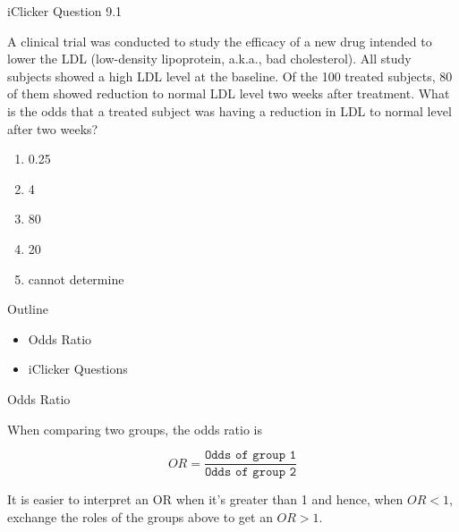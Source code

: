 \documentclass[14pt]{beamer}\usepackage[]{graphicx}\usepackage[]{color}
\begin{document}
\begin{frame}[fragile]{iClicker Question 9.1}

{\small{
A clinical trial was conducted to study the efficacy of a new drug  intended to lower the LDL (low-density lipoprotein, a.k.a., bad  cholesterol). All study subjects showed a high LDL level at the baseline.  Of the 100 treated subjects, 80 of them showed reduction to normal  LDL level two weeks after treatment. What is the odds that a treated  subject was having a reduction in LDL to normal level after two weeks?

\begin{enumerate}
\item 0.25
\item 4
\item 80
\item 20
\item cannot determine
\end{enumerate}
}}
\end{frame}

\begin{frame}[fragile]{Outline}

\begin{itemize}
\item Odds Ratio
\item iClicker Questions
\end{itemize}
\end{frame}


\begin{frame}[fragile]{Odds Ratio}

When comparing two groups, the odds ratio is

\vspace{3mm}

\begin{equation*}
OR = \frac{\texttt{Odds of group 1}}{\texttt{Odds of group 2}}
\end{equation*}

\vspace{3mm}

It is easier to interpret an OR when it's greater than 1 and hence, when  $OR < 1$, exchange the roles of the groups above to get an $OR > 1$.
\end{frame}
\end{document}
